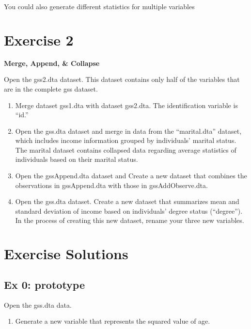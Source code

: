 \documentclass[]{book}
\providecommand{\tightlist}{%
  \setlength{\itemsep}{0pt}\setlength{\parskip}{0pt}}
\begin{document}
You could also generate different statistics for multiple variables

\section{Exercise 2}\label{exercise-2-5}

\textbf{Merge, Append, \& Collapse}

Open the gss2.dta dataset. This dataset contains only half of the
variables that are in the complete gss dataset.

\begin{enumerate}
\def\labelenumi{\arabic{enumi}.}
\tightlist
\item
  Merge dataset gss1.dta with dataset gss2.dta. The identification
  variable is ``id.''
\item
  Open the gss.dta dataset and merge in data from the ``marital.dta''
  dataset, which includes income information grouped by individuals'
  marital status. The marital dataset contains collapsed data regarding
  average statistics of individuals based on their marital status.
\item
  Open the gssAppend.dta dataset and Create a new dataset that combines
  the observations in gssAppend.dta with those in gssAddObserve.dta.
\item
  Open the gss.dta dataset. Create a new dataset that summarizes mean
  and standard deviation of income based on individuals' degree status
  (``degree''). In the process of creating this new dataset, rename your
  three new variables.
\end{enumerate}

\section{Exercise Solutions}\label{exercise-solutions-5}

\subsection{Ex 0: prototype}\label{ex-0-prototype-5}

Open the gss.dta data.

\begin{enumerate}
\def\labelenumi{\arabic{enumi}.}
\tightlist
\item
  Generate a new variable that represents the squared value of age.
\end{enumerate}
\end{document}
